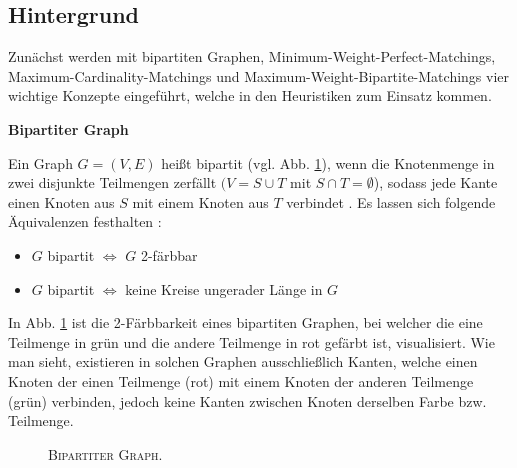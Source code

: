 \vfill
\pagebreak

\subsection{Hintergrund}
\label{sec:digressions}

Zunächst werden mit bipartiten Graphen, Minimum-Weight-Perfect-Matchings, Maximum-Cardinality-Matchings und Maximum-Weight-Bipartite-Matchings vier wichtige Konzepte eingeführt, welche in den Heuristiken zum Einsatz kommen.

\textbf{Bipartiter Graph}

Ein Graph $G = (V, E)$ heißt bipartit (vgl. Abb. \ref{fig:digression_bipartite_graph}), wenn die Knotenmenge in zwei disjunkte Teilmengen zerfällt
$(V = S \cup T$ mit $S \cap T = \emptyset$), sodass jede Kante einen Knoten aus $S$ mit einem Knoten aus $T$ verbindet \cite{HochschuleDarmstadt}.\newline
Es lassen sich folgende Äquivalenzen festhalten \cite{Leighton2010}:
\begin{itemize}
  \item $G$ bipartit $\iff$ $G$ 2-färbbar
  \item $G$ bipartit $\iff$ keine Kreise ungerader Länge in $G$
\end{itemize}
In Abb. \ref{fig:digression_bipartite_graph} ist die 2-Färbbarkeit eines bipartiten Graphen, bei welcher die eine Teilmenge
in grün und die andere Teilmenge in rot gefärbt ist, visualisiert. Wie man sieht, existieren in solchen Graphen
ausschließlich Kanten, welche einen Knoten der einen Teilmenge (rot) mit einem Knoten der anderen Teilmenge (grün) verbinden,
jedoch keine Kanten zwischen Knoten derselben Farbe bzw. Teilmenge.

\begin{figure}[H]
\centering
{}
\caption{\textsc{Bipartiter Graph.}}
\label{fig:digression_bipartite_graph}
\end{figure}

